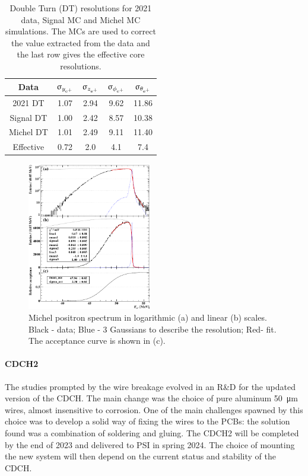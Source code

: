\begin{refsection}
\begin{table}
    \centering
    \begin{tabular}{ccccc}
        \hline
        Data & $\upsigma_{y_{\text{e}^+}}$ & $\upsigma_{z_{\text{e}^+}}$ & $\upsigma_{\phi_{\text{e}^+}}$ & $\upsigma_{\theta_{\text{e}^+}}$\\
        \hline
        \hline
        2021 DT& 1.07 & 2.94 & 9.62 & 11.86\\
        Signal DT& 1.00 & 2.42 & 8.57 & 10.38\\
        Michel DT& 1.01 & 2.49 & 9.11 & 11.40\\
        \hline
        Effective & 0.72 & 2.0 & 4.1 & 7.4\\
    \end{tabular}
    \caption[MEG II: resolutions and efficiencies]{Double Turn (DT) resolutions for 2021 data, Signal MC and Michel MC simulations. The MCs are used to correct the value extracted from the data and the last row gives the effective core resolutions.}
    \label{tab:CDCH:resolution}
\end{table}

        \begin{figure}
            \centering
            \includegraphics[width = 0.48\textwidth]{Figures/MEG/CDCH_michelfit.png}
            \caption[CDCH: resolution fit]{Michel positron spectrum in logarithmic (a) and linear (b) scales. Black - data; Blue - 3 Gaussians to describe the resolution; Red- fit. The acceptance curve is shown in (c).}
            \label{fig:MEGII:CDCH:michel}
        \end{figure}

        \paragraph{CDCH2} The studies prompted by the wire breakage evolved in an R\&D for the updated version of the CDCH. The main change was the choice of pure aluminum \SI{50}{\micro m} wires,  almost insensitive to corrosion.
        One of the main challenges spawned by this choice was to develop a solid way of fixing the wires to the PCBs: the solution found was a combination of soldering and gluing.
        The CDCH2 will be completed by the end of 2023 and delivered to PSI in spring 2024.
        The choice of mounting the new system will then depend on the current status and stability of the CDCH.


\end{refsection}
